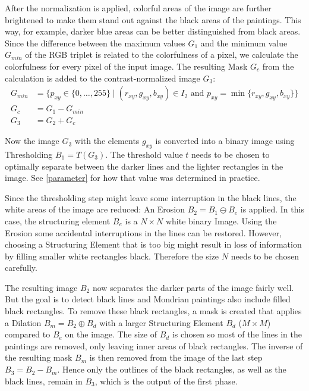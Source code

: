 \documentclass[serif,article,noparskip]{agse-thesis}
\begin{document}
After the normalization is applied, colorful areas of the image are further
brightened to make them stand out against the black areas of the paintings. This
way, for example, darker blue areas can be better distinguished from black
areas. Since the difference between the maximum values $G_1$ and the minimum
value $G_{min}$ of the RGB triplet is related to the colorfulness of a pixel, we
calculate the colorfulness for every pixel of the input image. The resulting
Mask $G_c$ from the calculation is added to the contrast-normalized image
$G_3$:
\begin{align}
G_{min} &= \{p_{xy} \in \{0,\ldots,255\} \mid (r_{xy},g_{xy},b_{xy})\in I_2\text{ and }p_{xy}=\min\{r_{xy},g_{xy},b_{xy}\}\}\\
G_c &= G_1 - G_{min}\\
G_3 &= G_2 + G_c
\end{align}

Now the image $G_3$ with the elements $g_{xy}$ is converted into a binary image
using Thresholding $B_1 = T(G_3)$. The threshold value $t$ needs to be chosen to
optimally separate between the darker lines and the lighter rectangles in the
image. See \ref{parameter} for how that value was determined in practice.

Since the thresholding step might leave some interruption in the black lines,
the white areas of the image are reduced: An Erosion $B_2 = B_1 \ominus B_e$ is
applied. In this case, the structuring element $B_e$ is a $N\times N$ white binary
Image. Using the Erosion some accidental interruptions in the lines can be
restored. However, choosing a Structuring Element that is too big might result
in loss of information by filling smaller white rectangles black. Therefore the
size $N$ needs to be chosen carefully.

The resulting image $B_2$ now separates the darker parts of the image fairly
well. But the goal is to detect black lines and Mondrian paintings also include
filled black rectangles. To remove these black rectangles, a mask is created
that applies a Dilation $B_m = B_2 \oplus B_d$ with a larger Structuring Element
$B_d$ ($M\times M$) compared to $B_e$ on the image. The size of $B_d$ is chosen
so most of the lines in the paintings are removed, only leaving inner areas of
black rectangles. The inverse of the resulting mask $B_m$ is then removed from
the image of the last step $B_3 = B_2 - B_m$. Hence only the outlines of the
black rectangles, as well as the black lines, remain in $B_3$, which is the
output of the first phase.
\end{document}
